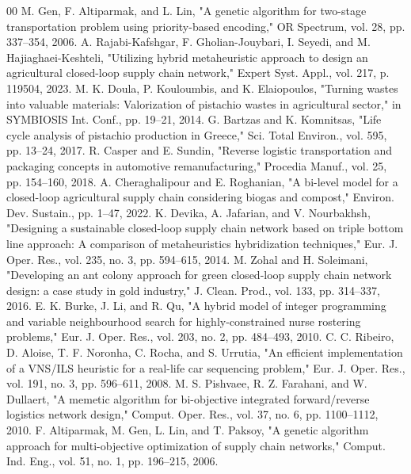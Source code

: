 \documentclass[conference]{IEEEtran}
\begin{document}

\begin{thebibliography}{00}
     M. Gen, F. Altiparmak, and L. Lin, "A genetic algorithm for two-stage transportation problem using priority-based encoding," OR Spectrum, vol. 28, pp. 337--354, 2006.
     A. Rajabi-Kafshgar, F. Gholian-Jouybari, I. Seyedi, and M. Hajiaghaei-Keshteli, "Utilizing hybrid metaheuristic approach to design an agricultural closed-loop supply chain network," Expert Syst. Appl., vol. 217, p. 119504, 2023.
     M. K. Doula, P. Kouloumbis, and K. Elaiopoulos, "Turning wastes into valuable materials: Valorization of pistachio wastes in agricultural sector," in SYMBIOSIS Int. Conf., pp. 19--21, 2014.
     G. Bartzas and K. Komnitsas, "Life cycle analysis of pistachio production in Greece," Sci. Total Environ., vol. 595, pp. 13--24, 2017.
     R. Casper and E. Sundin, "Reverse logistic transportation and packaging concepts in automotive remanufacturing," Procedia Manuf., vol. 25, pp. 154--160, 2018.
     A. Cheraghalipour and E. Roghanian, "A bi-level model for a closed-loop agricultural supply chain considering biogas and compost," Environ. Dev. Sustain., pp. 1--47, 2022.
     K. Devika, A. Jafarian, and V. Nourbakhsh, "Designing a sustainable closed-loop supply chain network based on triple bottom line approach: A comparison of metaheuristics hybridization techniques," Eur. J. Oper. Res., vol. 235, no. 3, pp. 594--615, 2014.
     M. Zohal and H. Soleimani, "Developing an ant colony approach for green closed-loop supply chain network design: a case study in gold industry," J. Clean. Prod., vol. 133, pp. 314--337, 2016.
     E. K. Burke, J. Li, and R. Qu, "A hybrid model of integer programming and variable neighbourhood search for highly-constrained nurse rostering problems," Eur. J. Oper. Res., vol. 203, no. 2, pp. 484--493, 2010.
     C. C. Ribeiro, D. Aloise, T. F. Noronha, C. Rocha, and S. Urrutia, "An efficient implementation of a VNS/ILS heuristic for a real-life car sequencing problem," Eur. J. Oper. Res., vol. 191, no. 3, pp. 596--611, 2008.
     M. S. Pishvaee, R. Z. Farahani, and W. Dullaert, "A memetic algorithm for bi-objective integrated forward/reverse logistics network design," Comput. Oper. Res., vol. 37, no. 6, pp. 1100--1112, 2010.
     F. Altiparmak, M. Gen, L. Lin, and T. Paksoy, "A genetic algorithm approach for multi-objective optimization of supply chain networks," Comput. Ind. Eng., vol. 51, no. 1, pp. 196--215, 2006.

\end{thebibliography}
\end{document}
